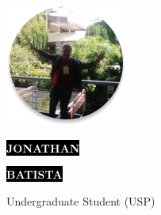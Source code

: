 \documentclass[9pt]{developercv} %
\begin{document}
\begin{minipage}[t]{0.25\textwidth} %
	\vspace{-\baselineskip} %
      \centering
       \includegraphics[width=0.8\linewidth]{FOTAJB.png}
	
\end{minipage}\hfill
\begin{minipage}[t]{0.45\textwidth} %
	\vspace{-\baselineskip} %
	
	\colorbox{black}{{\HUGE\textcolor{white}{\textbf{\MakeUppercase{Jonathan}}}}} %
	
	\colorbox{black}{{\HUGE\textcolor{white}{\textbf{\MakeUppercase{Batista}}}}} %
	
	\vspace{6pt}
	
	{\huge Undergraduate Student (USP)} %
\end{minipage}
\end{document}
